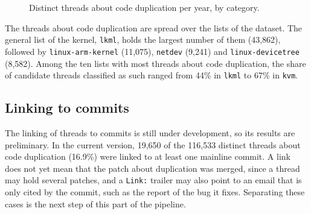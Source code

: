\begin{figure}[htbp]
    \centering
    \caption{Distinct threads about code duplication per year, by category.}
    \label{fig:results-per-year}
\end{figure}

The threads about code duplication are spread over the lists of the dataset. The general list of the kernel, \texttt{lkml}, holds the largest number of them (43,862), followed by \texttt{linux-arm-kernel} (11,075), \texttt{netdev} (9,241) and \texttt{linux-devicetree} (8,582). Among the ten lists with most threads about code duplication, the share of candidate threads classified as such ranged from 44\% in \texttt{lkml} to 67\% in \texttt{kvm}.

\subsection{Linking to commits}
\label{sec:results-commits}

The linking of threads to commits is still under development, so its results are preliminary. In the current version, 19,650 of the 116,533 distinct threads about code duplication (16.9\%) were linked to at least one mainline commit. A link does not yet mean that the patch about duplication was merged, since a thread may hold several patches, and a \texttt{Link:} trailer may also point to an email that is only cited by the commit, such as the report of the bug it fixes. Separating these cases is the next step of this part of the pipeline.
